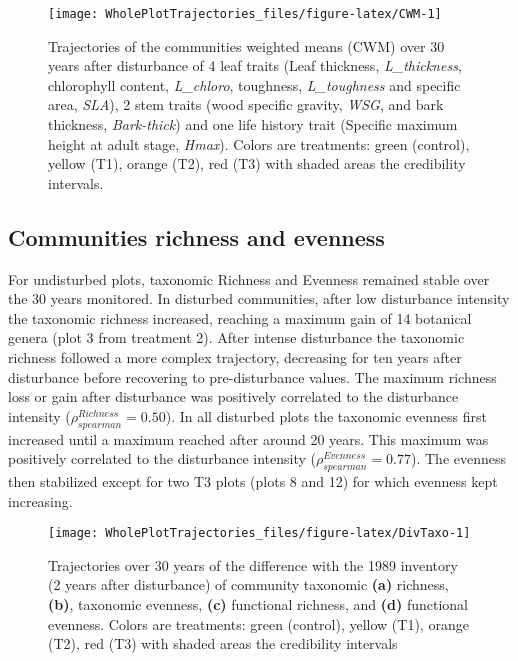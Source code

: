 \documentclass[fleqn,10pt]{ArtEcoFoG} %
\begin{document}
\begin{figure*}

{\centering \texttt{[image: WholePlotTrajectories\_files/figure-latex/CWM-1]} 

}

\caption{Trajectories of the communities weighted means (CWM) over 30 years after disturbance of 4 leaf traits (Leaf thickness, \emph{L\_thickness}, chlorophyll content, \emph{L\_chloro}, toughness, \emph{L\_toughness} and specific area, \emph{SLA}), 2 stem traits (wood specific gravity, \emph{WSG}, and bark thickness, \emph{Bark-thick}) and one life history trait (Specific maximum height at adult stage, \emph{Hmax}). Colors are treatments: green (control), yellow (T1), orange (T2), red (T3) with shaded areas the credibility intervals.}\label{fig:CWM}
\end{figure*}

\subsection{Communities richness and
evenness}\label{communities-richness-and-evenness}

For undisturbed plots, taxonomic Richness and Evenness remained stable
over the 30 years monitored. In disturbed communities, after low
disturbance intensity the taxonomic richness increased, reaching a
maximum gain of 14 botanical genera (plot 3 from treatment 2). After
intense disturbance the taxonomic richness followed a more complex
trajectory, decreasing for ten years after disturbance before recovering
to pre-disturbance values. The maximum richness loss or gain after
disturbance was positively correlated to the disturbance intensity
(\(\rho_{spearman}^{Richness}=0.50\)). In all disturbed plots the
taxonomic evenness first increased until a maximum reached after around
20 years. This maximum was positively correlated to the disturbance
intensity (\(\rho_{spearman}^{Evenness}=0.77\)). The evenness then
stabilized except for two T3 plots (plots 8 and 12) for which evenness
kept increasing.

\begin{figure*}

{\centering \texttt{[image: WholePlotTrajectories\_files/figure-latex/DivTaxo-1]} 

}

\caption{Trajectories over 30 years of the difference with the 1989 inventory (2 years after disturbance) of community taxonomic \textbf{(a)} richness, \textbf{(b)}, taxonomic evenness, \textbf{(c)} functional richness, and \textbf{(d)} functional evenness. Colors are treatments: green (control), yellow (T1), orange (T2), red (T3) with shaded areas the credibility intervals }\label{fig:DivTaxo}
\end{figure*}
\end{document}

